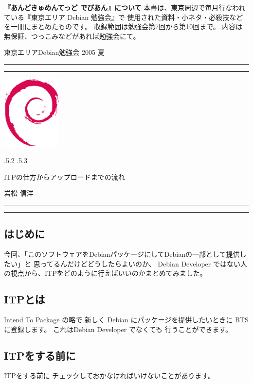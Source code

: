 \documentclass[mingoth,a4paper]{jsarticle}
\makeatletter
\renewcommand{\section}{\@startsection{section}{1}{\z@}%
    {\Cvs \@plus.5\Cdp \@minus.2\Cdp}%
    {.5\Cvs \@plus.3\Cdp}%
    {\normalfont\Large\headfont\raggedright\centering}} %
\newcommand{\dancersection}[2]{%
\newpage
東京エリアDebian勉強会 2005 夏
\hrule
\vspace{0.5mm}
\hrule
\hfill{}\includegraphics[width=3cm]{image200502/openlogo-nd.eps}\\
\vspace{-4cm}
\begin{center}
  \section{#1}
\end{center}
\hfill{}#2\hspace{3cm}\space\\
\hrule
\hrule
\vspace{1cm}
}
\makeatother
\begin{document}
\newpage
\setcounter{tocdepth}{1}
\tableofcontents
\vspace{6cm}

\large
\begin{itembox}{\bf『あんどきゅめんてっど でびあん』について}
本書は、東京周辺で毎月行なわれている『東京エリア Debian 勉強会』で
使用された資料・小ネタ・必殺技などを一冊にまとめたものです。
収録範囲は勉強会第7回から第10回まで。
内容は無保証、つっこみなどがあれば勉強会にて。
\end{itembox}
\normalfont


\dancersection{ITPの仕方からアップロードまでの流れ}{岩松 信洋}
\label{sec:iwamatsu}
\subsection{はじめに}

    今回、「このソフトウェアをDebianパッケージにしてDebianの一部として提供したい」と
    思ってるんだけどどうしたらよいのか、
    Debian Developer ではない人の視点から、ITPをどのように行えばいいのかまとめてみました。
	
\subsection{ITPとは}

    Intend To Package の略で 新しく Debian にパッケージを提供したいときに BTS に登録します。
    これはDebian Developer でなくても 行うことができます。
	
\subsection{ITPをする前に}

    ITPをする前に チェックしておかなければいけないことがあります。
	
\end{document}

